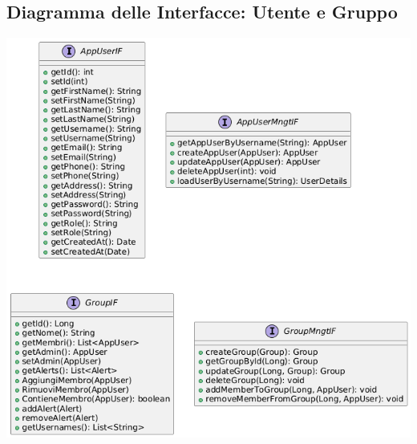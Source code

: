\subsection{Diagramma delle Interfacce: Utente e Gruppo}
\hspace{1pt}
\begin{center}
    \includegraphics[scale=0.5]{images/InterfaceUML-iterazione1.png}
\end{center}
